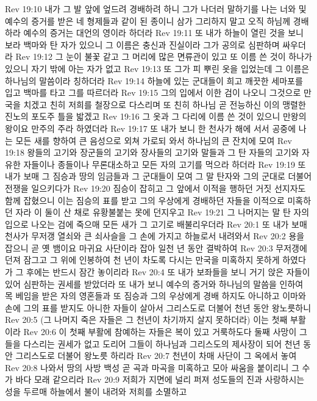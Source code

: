 Rev 19:10  내가 그 발 앞에 엎드려 경배하려 하니 그가 나더러 말하기를 나는 너와 및 예수의 증거를 받은 네 형제들과 같이 된 종이니 삼가 그리하지 말고 오직 하님께 경배하라 예수의 증거는 대언의 영이라 하더라
Rev 19:11  또 내가 하늘이 열린 것을 보니 보라 백마와 탄 자가 있으니 그 이름은 충신과 진실이라 그가 공의로 심판하며 싸우더라
Rev 19:12  그 눈이 불꽃 같고 그 머리에 많은 면류관이 있고 또 이름 쓴 것이 하나가 있으니 자기 밖에 아는 자가 없고
Rev 19:13  또 그가 피 뿌린 옷을 입었는데 그 이름은 하나님의 말씀이라 칭하더라
Rev 19:14  하늘에 있는 군대들이 희고 깨끗한 세마포를 입고 백마를 타고 그를 따르더라
Rev 19:15  그의 입에서 이한 검이 나오니 그것으로 만국을 치겠고 친히 저희를 철장으로 다스리며 또 친히 하나님 곧 전능하신 이의 맹렬한 진노의 포도주 틀을 밟겠고
Rev 19:16  그 옷과 그 다리에 이름 쓴 것이 있으니 만왕의 왕이요 만주의 주라 하였더라
Rev 19:17  또 내가 보니 한 천사가 해에 서서 공중에 나는 모든 새를 향하여 큰 음성으로 외쳐 가로되 와서 하나님의 큰 잔치에 모여
Rev 19:18  왕들의 고기와 장군들의 고기와 장사들의 고기와 말들과 그 탄 자들의 고기와 자유한 자들이나 종들이나 무론대소하고 모든 자의 고기를 먹으라 하더라
Rev 19:19  또 내가 보매 그 짐승과 땅의 임금들과 그 군대들이 모여 그 말 탄자와 그의 군대로 더불어 전쟁을 일으키다가
Rev 19:20  짐승이 잡히고 그 앞에서 이적을 행하던 거짓 선지자도 함께 잡혔으니 이는 짐승의 표를 받고 그의 우상에게 경배하던 자들을 이적으로 미혹하던 자라 이 둘이 산 채로 유황불붙는 못에 던지우고
Rev 19:21  그 나머지는 말 탄 자의 입으로 나오는 검에 죽으매 모든 새가 그 고기로 배불리우더라
Rev 20:1  또 내가 보매 천사가 무저갱 열쇠와 큰 쇠사슬을 그 손에 가지고 하늘로서 내려와서
Rev 20:2  용을 잡으니 곧 옛 뱀이요 마귀요 사단이라 잡아 일천 년 동안 결박하여
Rev 20:3  무저갱에 던져 잠그고 그 위에 인봉하여 천 년이 차도록 다시는 만국을 미혹하지 못하게 하였다가 그 후에는 반드시 잠간 놓이리라
Rev 20:4  또 내가 보좌들을 보니 거기 앉은 자들이 있어 심판하는 권세를 받았더라 또 내가 보니 예수의 증거와 하나님의 말씀을 인하여 목 베임을 받은 자의 영혼들과 또 짐승과 그의 우상에게 경배 하지도 아니하고 이마와 손에 그의 표를 받지도 아니한 자들이 살아서 그리스도로 더불어 천년 동안 왕노릇하니
Rev 20:5  (그 나머지 죽은 자들은 그 천년이 차기까지 살지 못하더라) 이는 첫째 부활이라
Rev 20:6  이 첫째 부활에 참예하는 자들은 복이 있고 거룩하도다 둘째 사망이 그들을 다스리는 권세가 없고 도리어 그들이 하나님과 그리스도의 제사장이 되어 천년 동안 그리스도로 더불어 왕노릇 하리라
Rev 20:7  천년이 차매 사단이 그 옥에서 놓여
Rev 20:8  나와서 땅의 사방 백성 곧 곡과 마곡을 미혹하고 모아 싸움을 붙이리니 그 수가 바다 모래 같으리라
Rev 20:9  저희가 지면에 널리 퍼져 성도들의 진과 사랑하시는 성을 두르매 하늘에서 불이 내려와 저희를 소멸하고
